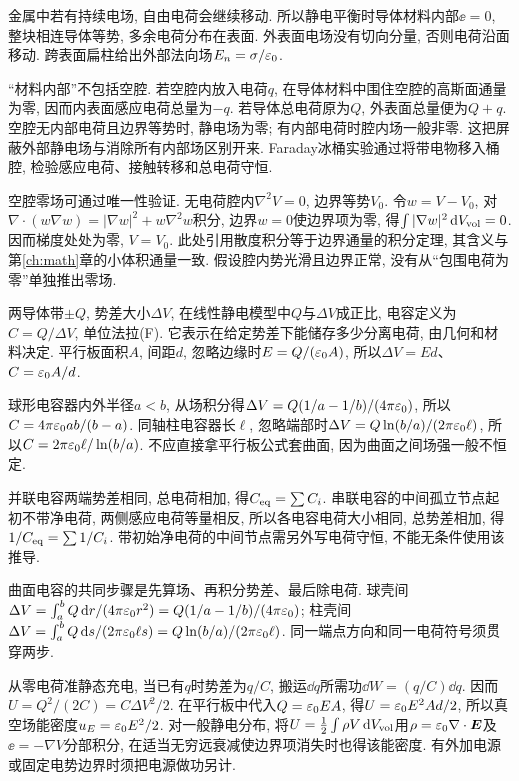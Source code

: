 \label{ch:capacitor}
金属中若有持续电场, 自由电荷会继续移动. 所以静电平衡时导体材料内部$\ee=0$, 整块相连导体等势, 多余电荷分布在表面. 外表面电场没有切向分量, 否则电荷沿面移动. 跨表面扁柱给出外部法向场$E_n=\sigma/\varepsilon_0$.

“材料内部”不包括空腔. 若空腔内放入电荷$q$, 在导体材料中围住空腔的高斯面通量为零, 因而内表面感应电荷总量为$-q$. 若导体总电荷原为$Q$, 外表面总量便为$Q+q$. 空腔无内部电荷且边界等势时, 静电场为零; 有内部电荷时腔内场一般非零. 这把屏蔽外部静电场与消除所有内部场区别开来. Faraday冰桶实验通过将带电物移入桶腔, 检验感应电荷、接触转移和总电荷守恒.

空腔零场可通过唯一性验证. 无电荷腔内$\nabla^2V=0$, 边界等势$V_0$. 令$w=V-V_0$, 对$\nabla\cdot(w\nabla w)=|\nabla w|^2+w\nabla^2w$积分, 边界$w=0$使边界项为零, 得$\int|\nabla w|^2\,\mathrm d V_{\rm vol}=0$. 因而梯度处处为零, $V=V_0$. 此处引用散度积分等于边界通量的积分定理, 其含义与第\ref{ch:math}章的小体积通量一致. 假设腔内势光滑且边界正常, 没有从“包围电荷为零”单独推出零场.

两导体带$\pm Q$, 势差大小$\Delta V$, 在线性静电模型中$Q$与$\Delta V$成正比, 电容定义为$C=Q/\Delta V$, 单位法拉(F). 它表示在给定势差下能储存多少分离电荷, 由几何和材料决定. 平行板面积$A$, 间距$d$, 忽略边缘时$E=Q/(\varepsilon_0 A)$, 所以$\Delta V=Ed$、$C=\varepsilon_0 A/d$.

球形电容器内外半径$a<b$, 从场积分得$\Delta V=Q(1/a-1/b)/(4\pi\varepsilon_0)$, 所以$C=4\pi\varepsilon_0 ab/(b-a)$. 同轴柱电容器长$\ell$, 忽略端部时$\Delta V=Q\ln(b/a)/(2\pi\varepsilon_0\ell)$, 所以$C=2\pi\varepsilon_0\ell/\ln(b/a)$. 不应直接拿平行板公式套曲面, 因为曲面之间场强一般不恒定.

并联电容两端势差相同, 总电荷相加, 得$C_{\rm eq}=\sum C_i$. 串联电容的中间孤立节点起初不带净电荷, 两侧感应电荷等量相反, 所以各电容电荷大小相同, 总势差相加, 得$1/C_{\rm eq}=\sum1/C_i$. 带初始净电荷的中间节点需另外写电荷守恒, 不能无条件使用该推导.

曲面电容的共同步骤是先算场、再积分势差、最后除电荷. 球壳间$\Delta V=\int_a^bQ\,\mathrm d r/(4\pi\varepsilon_0 r^2)=Q(1/a-1/b)/(4\pi\varepsilon_0)$; 柱壳间$\Delta V=\int_a^bQ\,\mathrm d s/(2\pi\varepsilon_0\ell s)=Q\ln(b/a)/(2\pi\varepsilon_0\ell)$. 同一端点方向和同一电荷符号须贯穿两步.

从零电荷准静态充电, 当已有$q$时势差为$q/C$, 搬运$\dd q$所需功$\dd W=(q/C)\dd q$. 因而$U=Q^2/(2C)=C\Delta V^2/2$. 在平行板中代入$Q=\varepsilon_0 EA$, 得$U=\varepsilon_0 E^2Ad/2$, 所以真空场能密度$u_E=\varepsilon_0 E^2/2$. 对一般静电分布, 将$U=\tfrac12\int\rho V\,\mathrm d V_{\rm vol}$用$\rho=\varepsilon_0\nabla\cdot\boldsymbol{E}$及$\ee=-\nabla V$分部积分, 在适当无穷远衰减使边界项消失时也得该能密度. 有外加电源或固定电势边界时须把电源做功另计.

